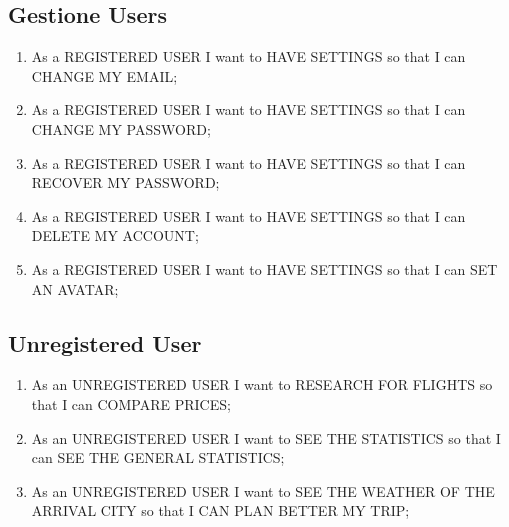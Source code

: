 \documentclass[11pt]{article}
\begin{document}
\subsection{Gestione Users}
\begin{enumerate}
	\item As a REGISTERED USER I want to HAVE SETTINGS so that I can CHANGE MY EMAIL;
	\item As a REGISTERED USER I want to HAVE SETTINGS so that I can CHANGE MY PASSWORD;
	\item As a REGISTERED USER I want to HAVE SETTINGS so that I can RECOVER MY PASSWORD;
	\item As a REGISTERED USER I want to HAVE SETTINGS so that I can DELETE MY ACCOUNT;
	\item As a REGISTERED USER I want to HAVE SETTINGS so that I can SET AN AVATAR;
\end{enumerate}

\subsection{Unregistered User}
\begin{enumerate}
	\item As an UNREGISTERED USER I want to RESEARCH FOR FLIGHTS so that I can COMPARE PRICES;
	\item As an UNREGISTERED USER I want to SEE THE STATISTICS so that I can SEE THE GENERAL STATISTICS;
	\item As an UNREGISTERED USER I want to SEE THE WEATHER OF THE ARRIVAL CITY so that I CAN PLAN BETTER MY TRIP;
\end{enumerate}
\end{document}
